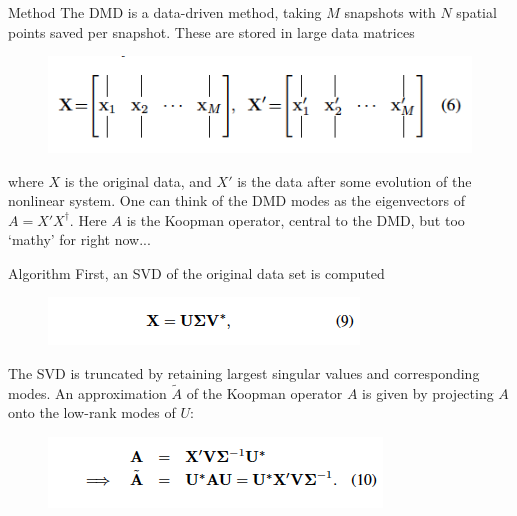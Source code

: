 \documentclass{beamer} \usepackage{graphicx,amsmath,amsfonts,amssymb,listings,tikz} \usepackage{multimedia}
\begin{document}
\begin{frame}{Method}
    The DMD is a data-driven method, taking $M$ snapshots with $N$ spatial
    points saved per snapshot. These are stored in large data matrices
    \begin{figure}
        \center
        \includegraphics[scale=0.5]{data.png}
    \end{figure}
    where $X$ is the original data, and $X'$ is the data after some evolution of
    the nonlinear system. One can think of the DMD modes as the
    eigenvectors of $A = X' X^{\dagger}$. Here $A$ is the Koopman operator,
    central to the DMD, but too `mathy' for right now...
\end{frame}

\begin{frame}{Algorithm}
    First, an SVD of the original data set is computed
    \begin{figure}
        \center
        \includegraphics[scale=0.5]{svd.png}
    \end{figure}
    The SVD is truncated by retaining largest singular values and corresponding
    modes. An approximation $\widetilde{A}$ of the Koopman operator $A$ is given
    by projecting $A$ onto the low-rank modes of $U$:
    \begin{figure}
        \center
        \includegraphics[scale=0.5]{koopman.png}
    \end{figure}
\end{frame}
\end{document}
